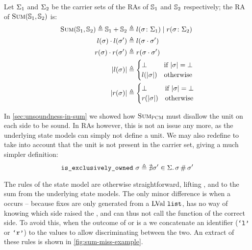 Let $\Sigma_1$ and $\Sigma_2$ be the carrier sets of the RAs of $\mathbb S_1$ and $\mathbb S_2$ respectively; the RA of $\textsc{Sum}(\mathbb S_1,\mathbb S_2)$ is:
\begin{align*}
	\textsc{Sum}(\mathbb S_1, \mathbb S_2) \triangleq \mathbb S_1+\mathbb S_2 &\triangleq l(\sigma\colon \Sigma_1) \mid r(\sigma\colon \Sigma_2)\\
	l(\sigma)\cdot l(\sigma') &\triangleq l(\sigma\cdot \sigma')\\
	r(\sigma)\cdot r(\sigma') &\triangleq r(\sigma\cdot \sigma')\\
	|l(\sigma)|&\triangleq \begin{cases}
 		\bot &\text{if}~ |\sigma|=\bot\\
 		l(|\sigma|) &\text{otherwise}
	 \end{cases}\\
	 |r(\sigma)|&\triangleq \begin{cases}
 		\bot &\text{if}~ |\sigma|=\bot\\
 		r(|\sigma|) &\text{otherwise}
	 \end{cases}
\end{align*}

In \cref{sec:unsoundness-in-sum} we showed how $\textsc{Sum}_{\textsc{PCM}}$ must disallow the unit on each side to be sound. In RAs however, this is not an issue any more, as the underlying state models can simply not define a unit. We may also redefine \isexowned{} to take into account that the unit is not present in the carrier set, giving a much simpler definition: \begin{align*}
	\texttt{is\_exclusively\_owned}~\sigma \triangleq \nexists \sigma'\in\Sigma\ldotp \sigma\operatorname{\#}\sigma'
\end{align*}

The rules of the \Sum{} state model are otherwise straightforward, lifting \execac, \consume{} and \produce{} to the sum from the underlying state models. The only minor difference is when a \Miss{} occurs -- because fixes are only generated from a $\text{LVal}~\texttt{list}$, \Sum{} has no way of knowing which side raised the \Miss, and can thus not call the \fix{} function of the correct side. To avoid this, when the outcome of \execac{} or \consume{} is a \Miss{} we concatenate an identifier ($\texttt{`l'}$ or $\texttt{`r'}$) to the values to allow discriminating between the two. An extract of these rules is shown in \autoref{fig:sum-miss-example}.

